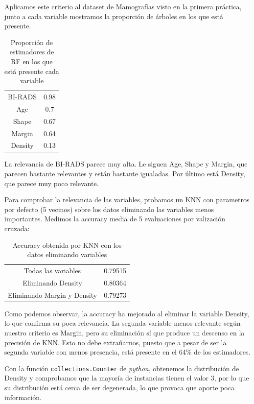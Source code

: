 \documentclass{article}
\begin{document}
  Aplicamos este criterio al dataset de Mamografías visto en la
  primera práctica, junto a cada variable mostramos la proporción de
  árboles en los que está presente.

  \begin{table}[H]
    \centering
    \begin{tabular}{c|c}
      BI-RADS     & 0.98 \\
      Age         & 0.7 \\
      Shape       & 0.67 \\
      Margin      & 0.64 \\
      Density     & 0.13
    \end{tabular}
    \caption{Proporción de estimadores de RF en los que está presente cada variable}
  \end{table}

  La relevancia de BI-RADS parece muy alta. Le siguen Age, Shape y
  Margin, que parecen bastante relevantes y están bastante
  igualadas. Por último está Density, que parece muy poco relevante.

  Para comprobar la relevancia de las variables, probamos un KNN con
  parametros por defecto (5 vecinos) sobre los datos eliminando las
  variables menos importantes. Medimos la accuracy media de 5
  evaluaciones por valización cruzada:

  \begin{table}[H]
    \centering
    \begin{tabular}{c|c}
      Todas las variables     & 0.79515 \\
      Eliminando Density         & 0.80364 \\
      Eliminando Margin y Density       & 0.79273
    \end{tabular}
    \caption{Accuracy obtenida por KNN con los datos eliminando
      variables}
  \end{table}

  Como podemos observar, la accuracy ha mejorado al eliminar la
  variable Density, lo que confirma su poca relevancia. La segunda
  variable menos relevante según nuestro criterio es Margin, pero su
  eliminación sí que produce un descenso en la precisión de KNN. Esto
  no debe extrañarnos, puesto que a pesar de ser la segunda variable
  con menos presencia, está presente en el 64\% de los estimadores.

  Con la función \texttt{collections.Counter} de \textit{python},
  obtenemos la distribución de Density y comprobamos que la mayoría de
  instancias tienen el valor 3, por lo que su distribución está cerca
  de ser degenerada, lo que provoca que aporte poca información.
\end{document}
